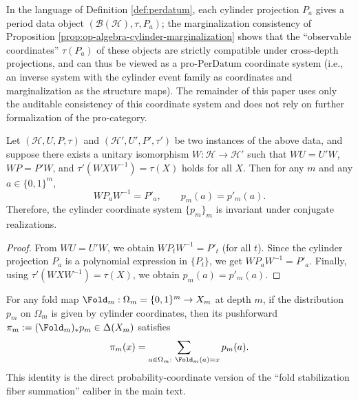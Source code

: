 \begin{remark}\label{rem:op-algebra-properdatum-coordinate}
In the language of Definition \ref{def:perdatum},
each cylinder projection \(P_a\) gives a period data object \((\mathcal{B}(\mathcal{H}),\tau,P_a)\);
the marginalization consistency of Proposition \ref{prop:op-algebra-cylinder-marginalization} shows that the ``observable coordinates''
\(\tau(P_a)\) of these objects are strictly compatible under cross-depth projections, and can thus be viewed as a pro-\(\mathrm{PerDatum}\) coordinate system
(i.e., an inverse system with the cylinder event family as coordinates and marginalization as the structure maps).
The remainder of this paper uses only the auditable consistency of this coordinate system and does not rely on further formalization of the pro-category.
\end{remark}

\begin{proposition}\label{prop:op-algebra-cylinder-naturality}
Let \((\mathcal{H},U,P,\tau)\) and \((\mathcal{H}',U',P',\tau')\) be two instances of the above data,
and suppose there exists a unitary isomorphism \(W:\mathcal{H}\to\mathcal{H}'\) such that
\(
WU=U'W
\),
\(
WP=P'W
\),
and \(\tau'(W X W^{-1})=\tau(X)\) holds for all \(X\).
Then for any \(m\) and any \(a\in\{0,1\}^m\),
\[
W P_a W^{-1}=P'_a,
\qquad
p_m(a)=p'_m(a).
\]
Therefore, the cylinder coordinate system \(\{p_m\}_m\) is invariant under conjugate realizations.
\end{proposition}

\begin{proof}
From \(WU=U'W\), we obtain \(W P_t W^{-1}=P'_t\) (for all \(t\)).
Since the cylinder projection \(P_a\) is a polynomial expression in \(\{P_t\}\), we get \(W P_a W^{-1}=P'_a\).
Finally, using \(\tau'(W X W^{-1})=\tau(X)\), we obtain \(p_m(a)=p'_m(a)\). \qedhere
\end{proof}

\begin{corollary}\label{cor:op-algebra-fold-pushforward-fiber-sum}
For any fold map \(\Fold_m:\Omega_m=\{0,1\}^m\to X_m\) at depth \(m\),
if the distribution \(p_m\) on \(\Omega_m\) is given by cylinder coordinates, then its pushforward \(\pi_m:=(\Fold_m)_*p_m\in\Delta(X_m)\) satisfies
\[
\pi_m(x)=\sum_{a\in\Omega_m:\ \Fold_m(a)=x} p_m(a).
\]
This identity is the direct probability-coordinate version of the ``fold stabilization fiber summation'' caliber in the main text.
\end{corollary}
